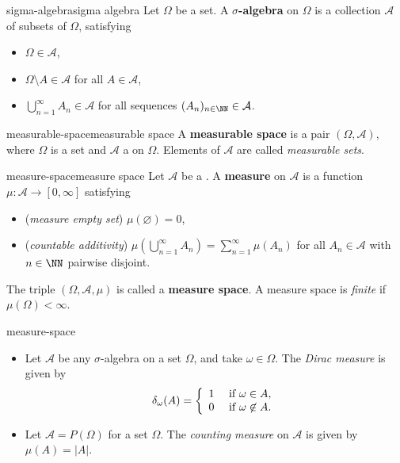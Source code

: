 \begin{topic}{sigma-algebra}{sigma algebra}
    Let $\Omega$ be a set. A \textbf{$\sigma$-algebra} on $\Omega$ is a collection $\mathcal{A}$ of subsets of $\Omega$, satisfying
    \begin{itemize}
        \item $\Omega \in \mathcal{A}$,
        \item $\Omega \setminus A \in \mathcal{A}$ for all $A \in \mathcal{A}$,
        \item $\bigcup_{n = 1}^\infty A_n \in \mathcal{A}$ for all sequences $(A_n)_{n \in \NN} \in \mathcal{A}$.
    \end{itemize}
\end{topic}

\begin{topic}{measurable-space}{measurable space}
    A \textbf{measurable space} is a pair $(\Omega, \mathcal{A})$, where $\Omega$ is a set and $\mathcal{A}$ a  on $\Omega$. Elements of $\mathcal{A}$ are called \textit{measurable sets}.
\end{topic}

\begin{topic}{measure-space}{measure space}
    Let $\mathcal{A}$ be a . A \textbf{measure} on $\mathcal{A}$ is a function $\mu : \mathcal{A} \to [0, \infty]$ satisfying
    \begin{itemize}
        \item (\textit{measure empty set}) $\mu(\varnothing) = 0$,
        \item (\textit{countable additivity}) $\mu(\bigcup_{n = 1}^\infty A_n) = \sum_{n = 1}^\infty \mu(A_n)$ for all $A_n \in \mathcal{A}$ with $n \in \NN$ pairwise disjoint.
    \end{itemize}
    The triple $(\Omega, \mathcal{A}, \mu)$ is called a \textbf{measure space}. A measure space is \textit{finite} if $\mu(\Omega) < \infty$.
\end{topic}

\begin{example}{measure-space}
    \begin{itemize}
        \item Let $\mathcal{A}$ be any $\sigma$-algebra on a set $\Omega$, and take $\omega \in \Omega$. The \textit{Dirac measure} is given by
        \[ \delta_\omega(A) = \left\{ \begin{array}{cl} 1 & \textup{ if } \omega \in A, \\ 0 & \textup{ if } \omega \not\in A . \end{array} \right. \]
        \item Let $\mathcal{A} = P(\Omega)$ for a set $\Omega$. The \textit{counting measure} on $\mathcal{A}$ is given by $\mu(A) = |A|$.
    \end{itemize}
\end{example}

